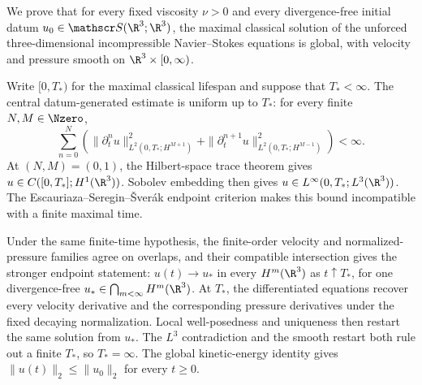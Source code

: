 
We prove that for every fixed viscosity \(\nu>0\) and every divergence-free initial datum \(u_0\in\mathscr S(\R^3;\R^3)\), the maximal classical solution of the unforced three-dimensional incompressible Navier--Stokes equations is global, with velocity and pressure smooth on \(\R^3\times[0,\infty)\).

Write \([0,T_*)\) for the maximal classical lifespan and suppose that \(T_*<\infty\).
The central datum-generated estimate is uniform up to \(T_*\): for every finite \(N,M\in\Nzero\),
\[
  \sum_{n=0}^{N}
  \left(
    \|\partial_t^n u\|_{L^2(0,T_*;H^{M+1})}^{2}
    +
    \|\partial_t^{n+1}u\|_{L^2(0,T_*;H^{M-1})}^{2}
  \right)
  <\infty.
\]
At \((N,M)=(0,1)\), the Hilbert-space trace theorem gives \(u\in C([0,T_*];H^1(\R^3))\).
Sobolev embedding then gives \(u\in L^\infty(0,T_*;L^3(\R^3))\).
The Escauriaza--Seregin--\v{S}ver\'ak endpoint criterion makes this bound incompatible with a finite maximal time.

Under the same finite-time hypothesis, the finite-order velocity and normalized-pressure families agree on overlaps, and their compatible intersection gives the stronger endpoint statement: \(u(t)\to u_*\) in every \(H^m(\R^3)\) as \(t\uparrow T_*\), for one divergence-free \(u_*\in\bigcap_{m<\infty}H^m(\R^3)\).
At \(T_*\), the differentiated equations recover every velocity derivative and the corresponding pressure derivatives under the fixed decaying normalization.
Local well-posedness and uniqueness then restart the same solution from \(u_*\).
The \(L^3\) contradiction and the smooth restart both rule out a finite \(T_*\), so \(T_*=\infty\).
The global kinetic-energy identity gives \(\|u(t)\|_2\leq\|u_0\|_2\) for every \(t\geq0\).
